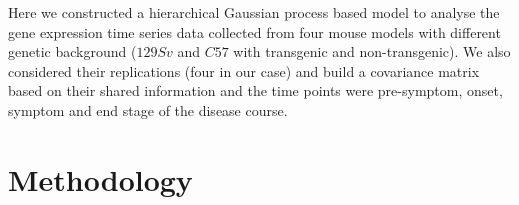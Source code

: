 Here we constructed a hierarchical Gaussian process \cite{Hensman:2013} based model to analyse the gene expression time series data collected from four mouse models with different genetic background ($129Sv$ and $C57$ with transgenic and non-transgenic). We also considered their replications (four in our case) and build a covariance matrix based on their shared information and the time points were pre-symptom, onset, symptom and end stage of the disease course.


\section{Methodology}

